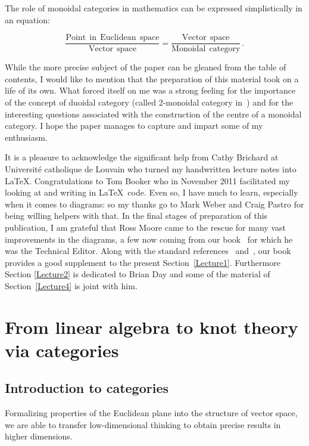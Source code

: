 \documentclass[a4paper,12pt]{article}
\theoremstyle{definition}
\theoremstyle{fact}
\theoremstyle{genquest}
\theoremstyle{step}
\begin{document}
The role of monoidal categories in mathematics can be expressed simplistically in an equation:
 
\[
\frac{\mathrm{Point \ \ in \ \ Euclidean \ \ space}}{\mathrm{Vector \ \ space}}=\frac{\mathrm{Vector \ \ space}}{\mathrm{Monoidal \ \ category}}\,.
\]

While the more precise subject of the paper can be gleaned from the table of contents, I would like to mention that the preparation of this material took on a life of its own. What forced itself on me was a strong feeling for the importance of the concept of duoidal category (called 2-monoidal category in~\cite{AguiarMahajan}) and for the interesting questions associated with the construction of the centre of a monoidal category. I hope the paper manages to capture and impart some of my enthusiasm.     

It is a pleasure to acknowledge the significant help from Cathy Brichard at Universit\'e catholique de Louvain who turned my handwritten lecture notes into \LaTeX . Congratulations to Tom Booker who in November 2011 facilitated my looking at and writing in \LaTeX\  code. 
Even so, I have much to learn, especially when it comes to diagrams: so my thanks go to Mark Weber and Craig Pastro for being willing helpers with that. 
In the final stages of preparation of this publication, I am grateful that Ross Moore came to the rescue for many vast improvements in the diagrams, a few now coming from our book~\cite{RossQG} for which he was the Technical Editor. 
Along with the standard references~\cite{CWM} and~\cite{Borceux}, 
our book provides a good supplement to the present Section~\ref{Lecture1}. 
Furthermore Section \ref{Lecture2} is dedicated to Brian Day and some of the material of Section~\ref{Lecture4} is joint with him.  

\tableofcontents

\clearpage
\section{From linear algebra to knot theory via categories\label{Lecture1}}

\subsection{Introduction to categories}

Formalizing properties of the Euclidean plane into the structure of vector space, 
we are able to transfer low-dimensional thinking to obtain precise results in higher dimensions.
\end{document}
